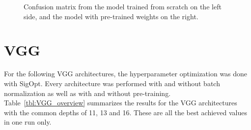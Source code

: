 \begin{figure}[!h]
\centering
\caption{Confusion matrix from the model trained from scratch on the left side, and the model with pre-trained weights on the right.}
\label{fig:alexnet-cm}
\end{figure}









\section{VGG}

For the following VGG architectures, the hyperparameter optimization was done with SigOpt. Every architecture was performed with and without batch normalization as well as with and without pre-training. Table~\ref{tbl:VGG_overview} summarizes the results for the VGG architectures with the common depths of 11, 13 and 16. These are all the best achieved values in one run only. \\


